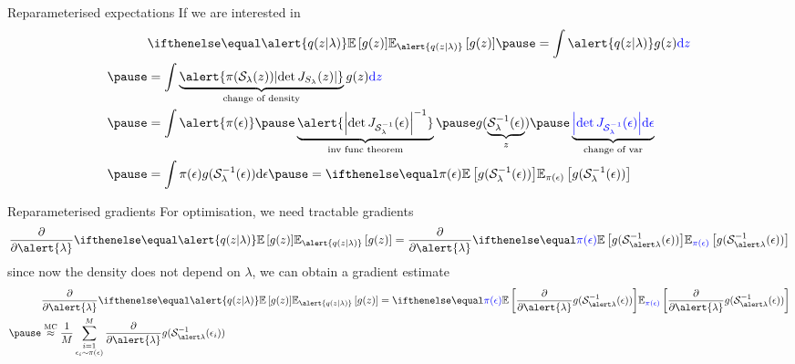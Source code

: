 \begin{frame}{Reparameterised expectations}
	If we are interested in 
	\begin{equation*}
	\begin{aligned}
		&  \E[\alert{q(z|\lambda)}]{g(z)} \pause = \int \alert{q(z|\lambda)} g(z) \textcolor{blue}{\dd z} \\ \pause
		&= \int \underbrace{\alert{\pi(\mathcal S_\lambda(z)) \djac{S_\lambda}{z}}}_{\text{change of density}} g(z) \textcolor{blue}{\dd z} \\ \pause
		&= \int \alert{\pi(\epsilon)} \pause \underbrace{\alert{\djac{\inv{\mathcal S}_\lambda}{\epsilon}^{-1}}}_{\text{inv func theorem}} \pause g(\underbrace{\inv{\mathcal S}_\lambda(\epsilon)}_{z}) \pause \underbrace{\textcolor{blue}{\djac{\inv{\mathcal S}_\lambda}{\epsilon} \dd \epsilon}}_{\text{change of var}} \\ \pause
		&= \int \pi(\epsilon) g(\inv{\mathcal S}_\lambda(\epsilon))\dd \epsilon \pause = \E[\pi(\epsilon)]{g(\inv{\mathcal S}_\lambda(\epsilon)) }
	\end{aligned}
	\end{equation*}
\end{frame}

\begin{frame}{Reparameterised gradients}
	For optimisation, we need tractable gradients
	\begin{equation*}
		\begin{aligned}
			\pdv{\alert{\lambda}}  \E[\alert{q(z|\lambda)}]{g(z)} = \pdv{\alert{\lambda}} \E[\textcolor{blue}{\pi(\epsilon)}]{g(\inv{\mathcal S}_{\alert\lambda}(\epsilon)) }
		\end{aligned}
	\end{equation*} \pause
	since now the density does not depend on $\lambda$, we can obtain a gradient estimate
	\begin{equation*}
		\begin{aligned}
			&\pdv{\alert{\lambda}}  \E[\alert{q(z|\lambda)}]{g(z)} =  \E[\textcolor{blue}{\pi(\epsilon)}]{\pdv{\alert{\lambda}} g(\inv{\mathcal S}_{\alert\lambda}(\epsilon)) } \\ \pause
			&\overset{\text{MC}}{\approx}  \frac{1}{M} \sum_{\substack{i=1\\ \epsilon_i \sim \pi(\epsilon)}}^M \pdv{\alert{\lambda}} g(\inv{\mathcal S}_{\alert\lambda}(\epsilon_i)) 
		\end{aligned}
	\end{equation*}
\end{frame}

